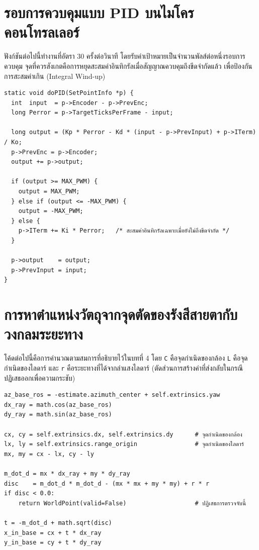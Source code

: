 \documentclass[a4paper,12pt]{report}
\begin{document}
\section{รอบการควบคุมแบบ PID บนไมโครคอนโทรลเลอร์}

ฟังก์ชันต่อไปนี้ทำงานที่อัตรา 30 ครั้งต่อวินาที
โดยรับค่าเป้าหมายเป็นจำนวนพัลส์ต่อหนึ่งรอบการควบคุม
จุดที่ควรสังเกตคือการหยุดสะสมค่าอินทิกรัลเมื่อสัญญาณควบคุมถึงขีดจำกัดแล้ว
เพื่อป้องกันการสะสมค่าเกิน (Integral Wind-up)

{\small
\begin{verbatim}
static void doPID(SetPointInfo *p) {
  int  input  = p->Encoder - p->PrevEnc;
  long Perror = p->TargetTicksPerFrame - input;

  long output = (Kp * Perror - Kd * (input - p->PrevInput) + p->ITerm) / Ko;
  p->PrevEnc = p->Encoder;
  output += p->output;

  if (output >= MAX_PWM) {
    output = MAX_PWM;
  } else if (output <= -MAX_PWM) {
    output = -MAX_PWM;
  } else {
    p->ITerm += Ki * Perror;   /* สะสมค่าอินทิกรัลเฉพาะเมื่อยังไม่ถึงขีดจำกัด */
  }

  p->output    = output;
  p->PrevInput = input;
}
\end{verbatim}
}

\section{การหาตำแหน่งวัตถุจากจุดตัดของรังสีสายตากับวงกลมระยะทาง}

โค้ดต่อไปนี้คือการคำนวณตามสมการที่อธิบายไว้ในบทที่ 4
โดย \texttt{C} คือจุดกำเนิดของกล้อง \texttt{L} คือจุดกำเนิดของไลดาร์
และ \texttt{r} คือระยะทางที่ได้จากลำแสงไลดาร์
(ตัดส่วนการสร้างค่าที่ส่งกลับในกรณีปฏิเสธออกเพื่อความกระชับ)

{\small
\begin{verbatim}
az_base_ros = -estimate.azimuth_center + self.extrinsics.yaw
dx_ray = math.cos(az_base_ros)
dy_ray = math.sin(az_base_ros)

cx, cy = self.extrinsics.dx, self.extrinsics.dy      # จุดกำเนิดของกล้อง
lx, ly = self.extrinsics.range_origin                # จุดกำเนิดของไลดาร์
mx, my = cx - lx, cy - ly

m_dot_d = mx * dx_ray + my * dy_ray
disc    = m_dot_d * m_dot_d - (mx * mx + my * my) + r * r
if disc < 0.0:
    return WorldPoint(valid=False)                   # ปฏิเสธการตรวจจับนี้

t = -m_dot_d + math.sqrt(disc)
x_in_base = cx + t * dx_ray
y_in_base = cy + t * dy_ray
\end{verbatim}
}
\end{document}
